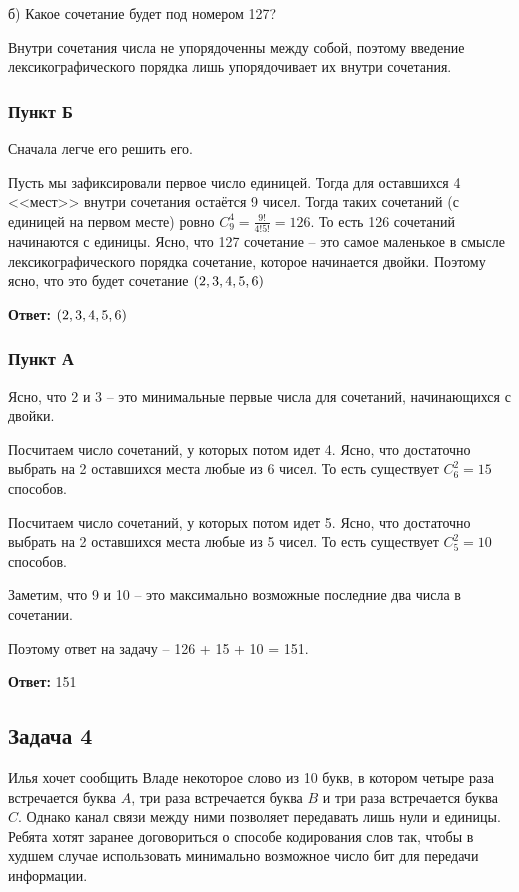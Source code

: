 б) Какое сочетание будет под номером 127?

\begin{solution*}
Внутри сочетания числа не упорядоченны между собой, поэтому введение лексикографического порядка лишь упорядочивает их внутри сочетания.

\subsubsection{Пункт Б}

Сначала легче его решить его.

Пусть мы зафиксировали первое число единицей. Тогда для оставшихся 4 <<мест>> внутри сочетания остаётся 9 чисел. Тогда таких сочетаний (с единицей на первом месте) ровно $C^4_9 = \frac{9!}{4!5!} = 126$. То есть 126 сочетаний начинаются с единицы. Ясно, что 127 сочетание -- это самое маленькое в смысле лексикографического порядка сочетание, которое начинается двойки. Поэтому ясно, что это будет сочетание $\left({2, 3, 4, 5, 6}\right)$

\textbf{Ответ:} $\left({2, 3, 4, 5, 6}\right)$ 

\subsubsection{Пункт А}

Ясно, что 2 и 3 -- это минимальные первые числа для сочетаний, начинающихся с двойки.

Посчитаем число сочетаний, у которых потом идет 4. Ясно, что достаточно выбрать на 2 оставшихся места любые из 6 чисел. То есть существует $C^2_6 = 15$ способов.

Посчитаем число сочетаний, у которых потом идет 5. Ясно, что достаточно выбрать на 2 оставшихся места любые из 5 чисел. То есть существует $C^2_5 = 10$ способов.

Заметим, что 9 и 10 -- это максимально возможные последние два числа в сочетании.

Поэтому ответ на задачу -- 126 + 15 + 10 = 151.
\end{solution*}

\textbf{Ответ:} 151 
 
\subsection{Задача 4}

Илья хочет сообщить Владе некоторое слово из 10 букв, в котором четыре раза встречается буква $A$, три раза встречается буква $B$ и три раза встречается буква $C$. Однако канал связи между ними позволяет передавать лишь нули и единицы. Ребята
хотят заранее договориться о способе кодирования слов так, чтобы в худшем случае
использовать минимально возможное число бит для передачи информации.

